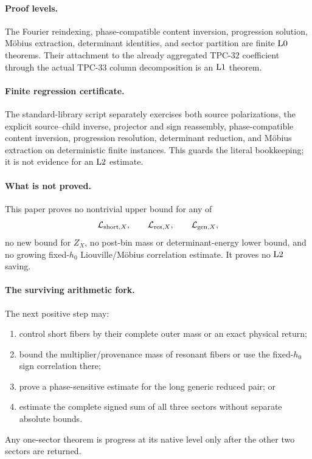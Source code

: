 \paragraph{Proof levels.}
The Fourier reindexing, phase-compatible content inversion,
progression solution, M\"obius extraction, determinant identities,
and sector partition are finite \(\mathrm{L0}\) theorems.  Their
attachment to the already aggregated TPC-32 coefficient through the
actual TPC-33 column decomposition is an \(\mathrm{L1}\) theorem.

\paragraph{Finite regression certificate.}
The standard-library script
 separately exercises
both source polarizations, the explicit source--child inverse,
projector and sign reassembly, phase-compatible content inversion,
progression resolution, determinant reduction, and M\"obius
extraction on deterministic finite instances.  This guards the
literal bookkeeping; it is not evidence for an \(\mathrm{L2}\) estimate.

\paragraph{What is not proved.}
This paper proves no nontrivial upper bound for any of
\[
 \mathcal L_{\mathrm{short},X},\qquad
 \mathcal L_{\mathrm{res},X},\qquad
 \mathcal L_{\mathrm{gen},X},
\]
no new bound for \(Z_X\), no post-bin mass or determinant-energy lower
bound, and no growing fixed-\(h_0\) Liouville/M\"obius correlation
estimate.  It proves no \(\mathrm{L2}\) saving.

\paragraph{The surviving arithmetic fork.}
The next positive step may:
\begin{enumerate}[label=(\alph*),leftmargin=2.2em]
\item control short fibers by their complete outer mass or an exact
physical return;
\item bound the multiplier/provenance mass of resonant fibers or use
the fixed-\(h_0\) sign correlation there;
\item prove a phase-sensitive estimate for the long generic reduced
pair; or
\item estimate the complete signed sum of all three sectors without
separate absolute bounds.
\end{enumerate}
Any one-sector theorem is progress at its native level only after the
other two sectors are returned.

